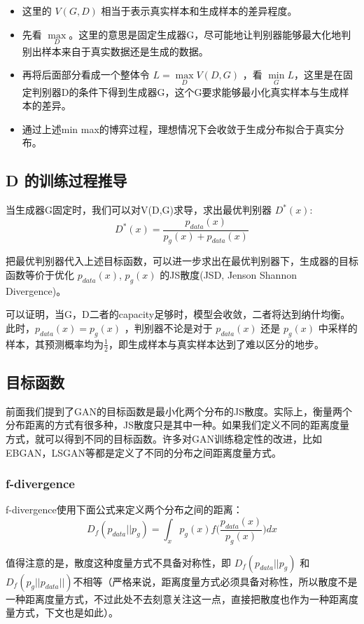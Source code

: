 \documentclass[12pt]{article}
\begin{document}
\begin{itemize}
\setlength{\itemsep}{0pt}
\setlength{\parsep}{0pt}
\setlength{\parskip}{0pt}
    \item 这里的 $V(G,D)$ 相当于表示真实样本和生成样本的差异程度。
    \item 先看 $\max\limits_D$。这里的意思是固定生成器G，尽可能地让判别器能够最大化地判别出样本来自于真实数据还是生成的数据。
    \item 再将后面部分看成一个整体令 $L = \max\limits_D V(D,G)$ ，看 $\min\limits_G L$，这里是在固定判别器D的条件下得到生成器G，这个G要求能够最小化真实样本与生成样本的差异。
    \item 通过上述min max的博弈过程，理想情况下会收敛于生成分布拟合于真实分布。
\end{itemize}

\subsection{D 的训练过程推导}
当生成器G固定时，我们可以对V(D,G)求导，求出最优判别器 $D^*(x)$:
$$
D^*(x) = \frac{p_{data}(x)}{p_g(x) + p_{data}(x)}
$$

把最优判别器代入上述目标函数，可以进一步求出在最优判别器下，生成器的目标函数等价于优化 $p_{data}(x)$, $p_g(x)$ 的JS散度(JSD, Jenson Shannon Divergence)。

可以证明，当G，D二者的capacity足够时，模型会收敛，二者将达到纳什均衡。此时，$p_{data}(x) = p_g(x)$ ，判别器不论是对于 $p_{data}(x) $ 还是  $p_g(x)$ 中采样的样本，其预测概率均为$\frac{1}{2}$，即生成样本与真实样本达到了难以区分的地步。

\subsection{目标函数}
前面我们提到了GAN的目标函数是最小化两个分布的JS散度。实际上，衡量两个分布距离的方式有很多种，JS散度只是其中一种。如果我们定义不同的距离度量方式，就可以得到不同的目标函数。许多对GAN训练稳定性的改进，比如EBGAN，LSGAN等都是定义了不同的分布之间距离度量方式。

\subsubsection{f-divergence}
f-divergence使用下面公式来定义两个分布之间的距离：
$$
D_f(p_{data}||p_g) =  \int_x p_g(x) f\Big(\frac{p_{data}(x)}{p_g(x)}\Big)dx
$$

值得注意的是，散度这种度量方式不具备对称性，即 $D_f(p_{data}||p_g)$ 和$D_f(p_g||p_{data}||)$不相等（严格来说，距离度量方式必须具备对称性，所以散度不是一种距离度量方式，不过此处不去刻意关注这一点，直接把散度也作为一种距离度量方式，下文也是如此）。
\end{document}
